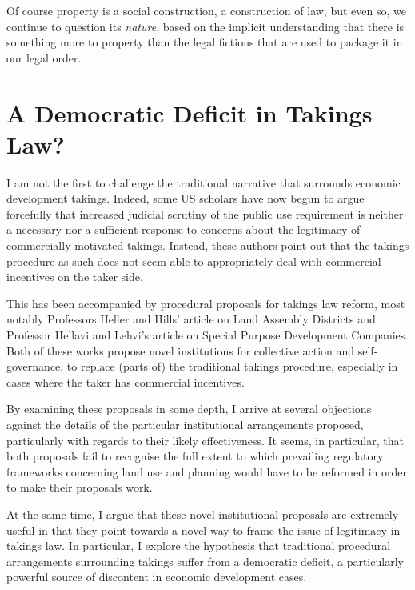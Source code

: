 {Of course property is a social construction, a construction of law, but even so, we continue to question its {\it nature}, based on the implicit understanding that there is something more to property than the legal fictions that are used to package it in our legal order.
}

\section{A Democratic Deficit in Takings Law?}

I am not the first to challenge the traditional narrative that surrounds economic development takings. Indeed, some US scholars have now begun to argue forcefully that increased judicial scrutiny of the public use requirement is neither a necessary nor a sufficient response to concerns about the legitimacy of commercially motivated takings. Instead, these authors point out that the takings procedure as such does not seem able to appropriately deal with commercial incentives on the taker side.

This has been accompanied by procedural proposals for takings law reform, most notably Professors Heller and Hills' article on Land Assembly Districts and Professor Hellavi and Lehvi's article on Special Purpose Development Companies. Both of these works propose novel institutions for collective action and self-governance, to replace (parts of) the traditional takings procedure, especially in cases where the taker has commercial incentives.

By examining these proposals in some depth, I arrive at several objections against the details of the particular institutional arrangements proposed, particularly with regards to their likely effectiveness. It seems, in particular, that both proposals fail to recognise the full extent to which prevailing regulatory frameworks concerning land use and planning would have to be reformed in order to make their proposals work.

At the same time, I argue that these novel institutional proposals are extremely useful in that they point towards a novel way to frame the issue of legitimacy in takings law. In particular, I explore the hypothesis that traditional procedural arrangements surrounding takings suffer from a democratic deficit, a particularly powerful source of discontent in economic development cases.

